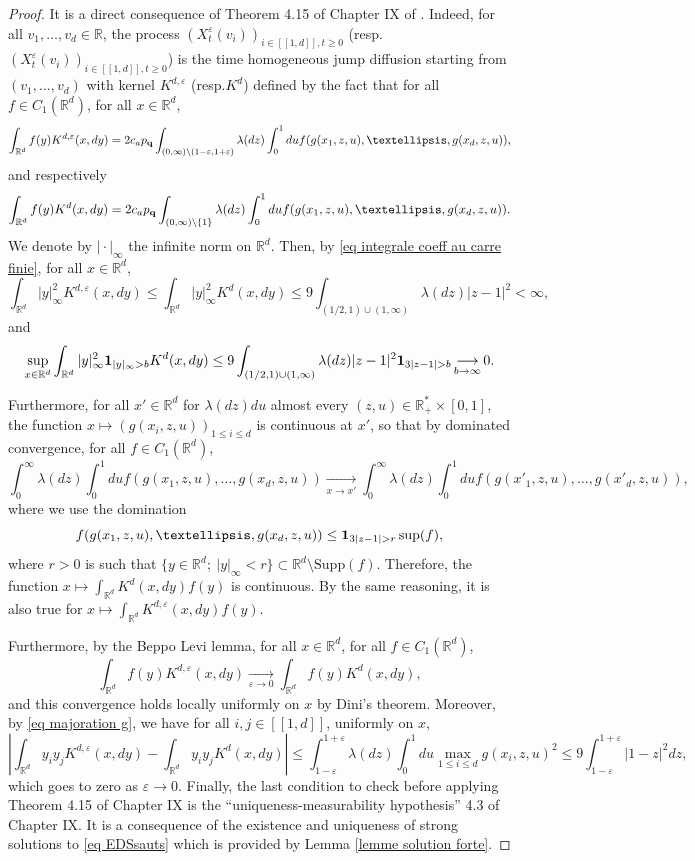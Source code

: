 \documentclass[11pt]{article}
\numberwithin{equation}{section}
\def\vp{\varepsilon}
\def \R{\mathbb {R}}
\def\lb{[\![}
\def\rb{]\!]}
\begin{document}
 \begin{proof}
 	It is a direct consequence of Theorem 4.15 of Chapter IX of \cite{JS87}. Indeed, for all $v_1, \ldots, v_d \in \R$, the process $(X_t^{\vp}(v_i))_{ i \in \lb 1,d\rb, t\ge 0}$ (resp.\@ $(X_t^{\vp}(v_i))_{ i \in \lb 1,d \rb, t\ge 0}$) is the time homogeneous jump diffusion starting from $(v_1,\ldots, v_d)$ with kernel $K^{d,\vp}$ (resp.\@ $K^d$) defined by the fact that for all $f \in C_1(\R^d)$, for all $x \in \R^d$,
 	$$
 	\int_{\R^d} f(y) K^{d,\vp}(x , dy )
 	=
 	2c_a p_{\bf q}\int_{(0,\infty) \setminus(1-\vp,1+\vp)} \lambda(dz) \int_{0}^1 du f(g(x_1,z,u), \ldots ,g(x_d,z,u)),
 	$$
 	and respectively
 	$$
 	\int_{\R^d} f(y) K^{d}(x , dy )
 	=
 	2c_a p_{\bf q}\int_{(0,\infty)\setminus\{1\}} \lambda(dz) \int_0^1du f(g(x_1,z,u), \ldots ,g(x_d,z,u)).
 	$$
 	We denote by $\vert \cdot \vert_\infty$ the infinite norm on $\R^d$. Then, by \eqref{eq integrale coeff au carre finie}, for all $x\in \R^d$,
 	$$
 	\int_{\R^d} \vert y \vert_\infty^2 K^{d,\vp}(x,dy) \le \int_{\R^d} \vert y \vert_\infty^2 K^d(x,dy)
 	\le 9  \int_{(1/2,1) \cup (1,\infty)} \lambda(dz) \vert z-1 \vert^2 <\infty,
 	$$
 	and
 	$$
 	\sup_{x \in \R^d} \int_{\R^d} \vert y \vert_\infty^2{\bf 1}_{\vert y \vert_\infty>b} K^d(x,dy)
 	\le 9 \int_{(1/2,1) \cup (1,\infty)} \lambda(dz) \vert z-1 \vert^2 {\bf 1}_{3\vert z-1 \vert >b}
 	\mathop{\longrightarrow}\limits_{b\to \infty} 0.
 	$$
 	
 	{Furthermore}, for all $x' \in \R^d$ for $\lambda(dz) du$ almost every $(z,u) \in \R_+^* \times [0,1]$, the function $x\mapsto (g(x_i,z,u))_{1 \le i \le d}$ is continuous at $x'$, so that by dominated convergence, for all $f \in C_1(\R^d)$,
 	$$
 	\int_0^\infty \lambda(dz) \int_0^1du f(g(x_1, z, u), \ldots, g(x_d,z,u))
 	\mathop{\longrightarrow}\limits_{x\to x'}
 	\int_0^\infty \lambda(dz) \int_0^1du f(g(x'_1, z, u), \ldots, g(x'_d,z,u)),
 	$$
 	where we use the domination
 	$$
 	f(g(x_1, z, u), \ldots, g(x_d,z,u)) \le {\bf 1}_{3\vert z -1 \vert >r} \sup (f),
 	$$
 	where $r>0$ is such that $\{y \in \R^d; \ \vert y \vert_\infty <r\}\subset \R^d \setminus \mathrm{Supp}(f)$. Therefore, the function $x\mapsto \int_{\R^d} K^d(x,dy)f(y)$ is continuous. By the same reasoning, it is also true for $x\mapsto \int_{\R^d} K^{d,\vp}(x,dy)f(y)$.
 	
 	Furthermore, by the Beppo Levi lemma, for all $x\in \R^d$, for all $f\in C_1(\R^d)$,
 	$$
 	\int_{\R^d} f(y)K^{d,\vp}(x,dy) \mathop{\longrightarrow}\limits_{\vp \to 0}
 	\int_{\R^d} f(y)K^d(x,dy),
 	$$
 	and this convergence holds locally uniformly on $x$ by Dini's theorem. Moreover, by \eqref{eq majoration g}, we have for all $i,j \in \lb 1, d \rb$, uniformly on $x$,
 	$$
 	\left\vert \int_{\R^d} y_iy_jK^{d,\vp}(x,dy) - \int_{\R^d} y_i y_j K^d (x,dy)\right\vert \le \int_{1-\vp}^{1+\vp} \lambda(dz)\int_0^1 du \max_{1 \le i \le d} g(x_i,z,u)^2\le 9 \int_{1-\vp}^{1+\vp} \vert 1-z\vert^2dz,
 	$$
 	which goes to zero as $\vp \to 0$. Finally, the last condition to check before applying Theorem 4.15 of Chapter IX is the ``uniqueness-measurability hypothesis'' 4.3 of Chapter IX. It is a consequence of the existence and uniqueness of strong solutions to \eqref{eq EDSsauts} which is provided by Lemma \ref{lemme solution forte}.
 \end{proof}
\end{document}
